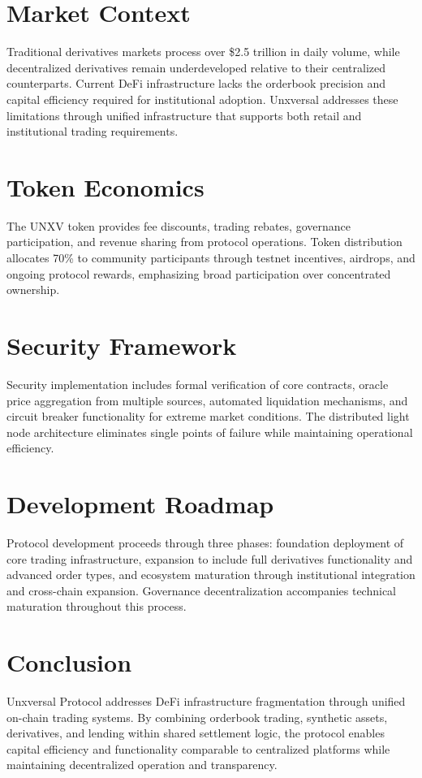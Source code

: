 \documentclass[12pt]{article}
\begin{document}
\section{Market Context}
Traditional derivatives markets process over \$2.5 trillion in daily volume, while decentralized derivatives remain underdeveloped relative to their centralized counterparts. Current DeFi infrastructure lacks the orderbook precision and capital efficiency required for institutional adoption. Unxversal addresses these limitations through unified infrastructure that supports both retail and institutional trading requirements.

\section{Token Economics}
The UNXV token provides fee discounts, trading rebates, governance participation, and revenue sharing from protocol operations. Token distribution allocates 70\% to community participants through testnet incentives, airdrops, and ongoing protocol rewards, emphasizing broad participation over concentrated ownership.

\section{Security Framework}
Security implementation includes formal verification of core contracts, oracle price aggregation from multiple sources, automated liquidation mechanisms, and circuit breaker functionality for extreme market conditions. The distributed light node architecture eliminates single points of failure while maintaining operational efficiency.

\section{Development Roadmap}
Protocol development proceeds through three phases: foundation deployment of core trading infrastructure, expansion to include full derivatives functionality and advanced order types, and ecosystem maturation through institutional integration and cross-chain expansion. Governance decentralization accompanies technical maturation throughout this process.

\section{Conclusion}
Unxversal Protocol addresses DeFi infrastructure fragmentation through unified on-chain trading systems. By combining orderbook trading, synthetic assets, derivatives, and lending within shared settlement logic, the protocol enables capital efficiency and functionality comparable to centralized platforms while maintaining decentralized operation and transparency.
\end{document}
